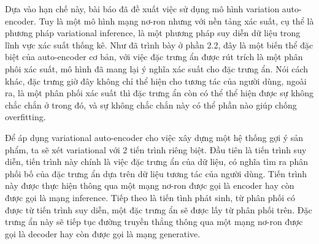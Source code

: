     Dựa vào hạn chế này, bài báo đã đề xuất việc sử dụng mô hình variation auto-encoder. 
    Tuy là một mô hình mạng nơ-ron nhưng với nền tảng xác suất, cụ thể là phương pháp variational inference, là một phương pháp suy diễn dữ liệu trong lĩnh vực xác suất thống kê.
    Như đã trình bày ở phần 2.2, đây là một biến thể đặc biệt của auto-encoder cơ bản, với việc đặc trưng ẩn được rút trích là một phân phôi xác suất, mô hình đã mang lại ý nghĩa xác suất cho đặc trưng ẩn.
    Nói cách khác, đặc trưng giờ đây không chỉ thể hiện cho tương tác của người dùng, ngoài ra, là một phân phối xác suất thì đặc trưng ẩn còn có thể thể hiện được sự không chắc chắn ở trong đó, và sự không chắc chắn này có thể phần nào giúp chống overfitting.



    
    Để áp dụng variational auto-encoder cho việc xây dựng một hệ thống gợi ý sản phẩm, ta sẽ xét variational với 2 tiến trình riêng biệt. 
    Đầu tiên là tiến trình suy diễn, tiến trình này chính là việc đặc trưng ẩn của dữ liệu, có nghĩa tìm ra phân phối bố của đặc trưng ẩn dựa trên dữ liệu tương tác của người dùng. 
    Tiến trình này được thực hiện thông qua một mạng nơ-ron được gọi là encoder hay còn được gọi là mạng inference.
    Tiếp theo là tiến tình phát sinh, từ phân phối có được từ tiến trình suy diễn, một đặc trưng ẩn sẽ được lấy từ phân phối trên. 
    Đặc trưng ẩn này sẽ tiếp tục đường truyền thẳng thông qua một mạng nơ-ron được gọi là decoder hay còn được gọi là mạng generative.



